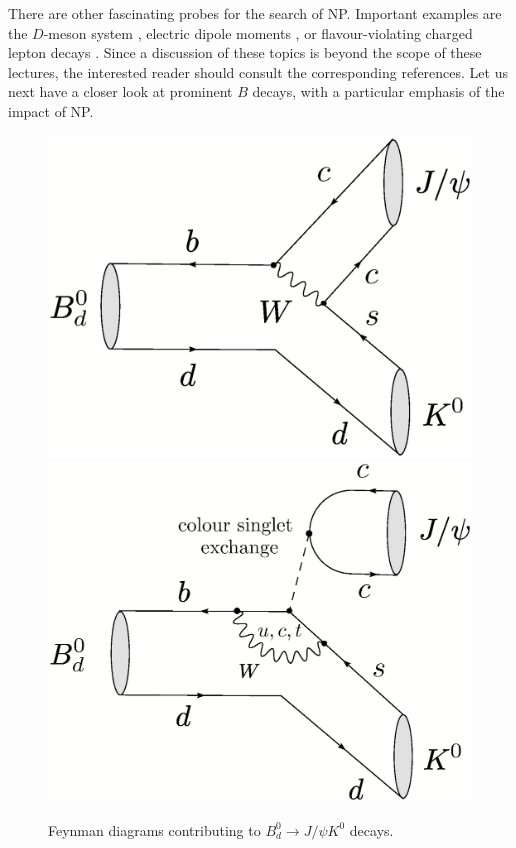 \documentclass[12pt]{article}
\begin{document}
There are other fascinating probes for the search of NP. Important examples are 
the $D$-meson system \cite{petrov}, electric dipole moments \cite{PR}, or 
flavour-violating charged lepton decays \cite{CEPRT}. Since a discussion of
these topics is beyond the scope of these lectures, the interested reader should consult 
the corresponding references. Let us next have a closer look at prominent $B$ 
decays, with a particular emphasis of the impact of NP.  


\begin{figure}[t]
\centerline{
 \includegraphics[width=5.7truecm]{B0dtoK0Jpsi-tree.ps}
 \hspace*{0.5truecm}
 \includegraphics[width=5.7truecm]{B0dtoK0Jpsi-pen.ps}  
 }
 \vspace*{-0.3truecm}
\caption{Feynman diagrams contributing to $B^0_d\to J/\psi K^0$ 
decays.}\label{fig:BpsiK-diag}
\end{figure}
\end{document}
